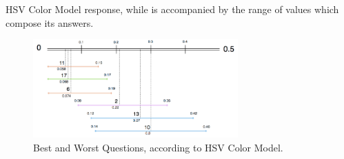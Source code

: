 HSV Color Model response, while is accompanied by the range of values which compose its answers. \par
%
\begin{figure}[!htbp]
  \centering
  \includegraphics[width=0.7\textwidth]{images/results/hsv_questions_analysis.png}
  \caption[Best and Worst Questions, according to HSV Color Model.]{Best and Worst Questions, according to HSV Color Model.}
  \label{fig:hsv_analysis}
\end{figure}
%
%
